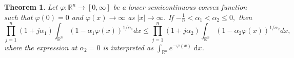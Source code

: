 \documentclass[11pt]{amsart}
\theoremstyle{plain}
\newtheorem{theorem}{Theorem}[section]
\theoremstyle{definition}
\theoremstyle{remark}
\begin{document}
\begin{theorem} \label{thm:monotonicity-alpha-base}
    Let $\varphi: \mathbb{R}^n \rightarrow[0, \infty]$ be a lower semicontinuous convex function such that $\varphi(0)=0$ and $ \varphi (x) \to \infty$ as $|x| \to \infty$. If
    $
    -\frac{1}{n}<\alpha_1<\alpha_2 \leq 0,
    $
    then
    \begin{equation} \label{eq:monotonicity-alpha-base}
        \prod_{j=1}^n\left(1+j \alpha_1\right) \int_{\mathbb{R}^n}\left(1-\alpha_1 \varphi(x)\right)^{1 / \alpha_1} d x
        \leq
        \prod_{j=1}^n\left(1+j \alpha_2\right) \int_{\mathbb{R}^n}\left(1-\alpha_2 \varphi(x)\right)^{1 / \alpha_2} d x,
    \end{equation}
    where the expression at $\alpha_2=0$ is interpreted as $\int_{\mathbb{R}^n} e^{-\varphi(x)} \;\mathrm d x$.
\end{theorem}
\end{document}
